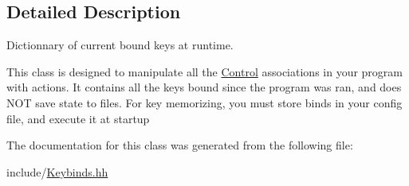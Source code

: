 \subsection{Detailed Description}
Dictionnary of current bound keys at runtime. 

This class is designed to manipulate all the \hyperlink{classControl}{Control} associations in your program with actions. It contains all the keys bound since the program was ran, and does N\+OT save state to files. For key memorizing, you must store binds in your config file, and execute it at startup 

The documentation for this class was generated from the following file\+:\begin{DoxyCompactItemize}
\item 
include/\hyperlink{Keybinds_8hh}{Keybinds.\+hh}\end{DoxyCompactItemize}
